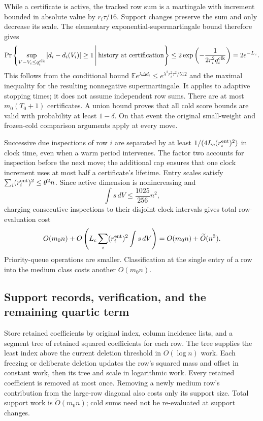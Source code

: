 \documentclass[11pt]{amsart}
\theoremstyle{remark}\newtheorem{remark}[theorem]{Remark}
\begin{document}
While a certificate is active, the tracked row sum is a martingale with
increment bounded in absolute value by $r_i\tau/16$. Support changes
preserve the sum and only decrease its scale. The elementary
exponential-supermartingale bound therefore gives
\[
 \Pr\left\{\sup_{V-V_i\le q_i^{\rm clk}}|d_i-d_i(V_i)|\ge1
       \,\middle|\,\text{history at certification}\right\}
 \le2\exp\left(-\frac{1}{2r_i^2q_i^{\rm clk}}\right)
 =2e^{-L_c}.
\]
This follows from the conditional bound
$\mathbb E e^{\lambda\Delta d_i}\le
e^{\lambda^2r_i^2\tau^2/512}$ and the maximal inequality for the
resulting nonnegative supermartingale. It applies to adaptive stopping
times; it does not assume independent row sums.
There are at most $m_0(T_0+1)$ certificates. A union bound proves that all
cold score bounds are valid with probability at least $1-\delta$.
On that event the original small-weight and frozen-cold comparison
arguments apply at every move.

Successive due inspections of row $i$ are separated by at least
$1/(4L_c(r_i^{\rm ent})^2)$ in clock time, even when a warm period
intervenes. The factor two accounts for inspection before the next move;
the additional cap ensures that one clock increment uses at most half
a certificate's lifetime. Entry scales satisfy
$\sum_i(r_i^{\rm ent})^2\le\theta^2n$.
Since active dimension is nonincreasing and
\[
 \int s\,dV\le\frac{1025}{256}n^2,
\]
charging consecutive inspections to their disjoint clock intervals gives
total row-evaluation cost
\[
 O(m_0n)+O\left(L_c\sum_i(r_i^{\rm ent})^2\int s\,dV\right)
 =O(m_0n)+\widetilde O(n^3).
\]
Priority-queue operations are smaller. Classification at the single
entry of a row into the medium class costs another $O(m_0n)$.

\subsection{Support records, verification, and the remaining quartic term}
Store retained coefficients by original index, column incidence lists,
and a segment tree of retained squared coefficients for each row.
The tree supplies the least index above the current deletion threshold
in $O(\log n)$ work. Each freezing or deliberate deletion updates the
row's squared mass and offset in constant work, then its tree and scale
in logarithmic work. Every retained coefficient is removed at most once.
Removing a newly medium row's contribution from the large-row diagonal
also costs only its support size. Total support work is
$\widetilde O(m_0n)$; cold sums need not be re-evaluated at support changes.
\end{document}
